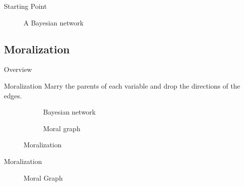 \documentclass[10pt,usenames,dvipsnames]{beamer}
\begin{document}
\begin{frame}{Starting Point}
  \begin{figure}
    \scalebox{1.0}{}
    \caption{A Bayesian network}
  \end{figure}
\end{frame}

\subsection{Moralization}

\begin{frame}{Overview}
  \begin{figure}
    \vspace{0.6cm} %
  \end{figure}
\end{frame}

\begin{frame}{Moralization}
  \centering
  {\footnotesize Marry the parents of each variable and drop the directions of the edges.}
  \begin{figure}[h]  
    \begin{subfigure}[b]{0.49\linewidth}
      \centering
      \scalebox{1.0}{}
      \caption{Bayesian network}
    \end{subfigure}
    \begin{subfigure}[b]{0.49\linewidth}
      \centering
      \scalebox{1.0}{}
      \caption{Moral graph}
    \end{subfigure}
    \caption{Moralization}
  \end{figure}  
\end{frame}

\begin{frame}{Moralization}
  \begin{figure}
    \scalebox{1.0}{}
    \caption{Moral Graph}
  \end{figure}
\end{frame}
\end{document}
